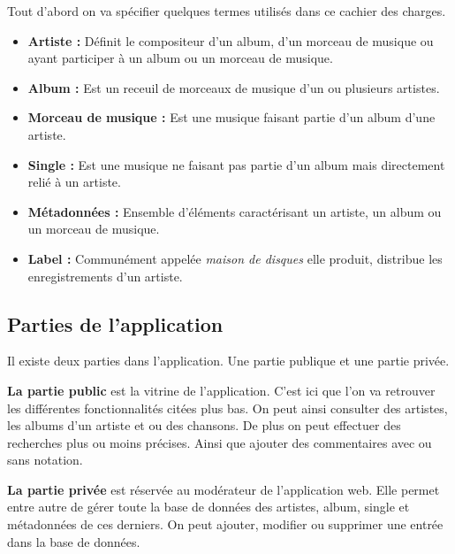     \begin{paragraphe}
      Tout d'abord on va spécifier quelques termes utilisés dans ce cachier des
      charges.
      \begin{itemize}
        \item \textbf{Artiste :} Définit le compositeur d'un album, d'un
          morceau de musique ou ayant participer à un album ou un morceau de
          musique.
        \item \textbf{Album :} Est un receuil de morceaux de musique d'un ou
          plusieurs artistes.
        \item \textbf{Morceau de musique :} Est une musique faisant partie d'un
          album d'une artiste.
        \item \textbf{Single :} Est une musique ne faisant pas partie d'un album
          mais directement relié à un artiste.
        \item \textbf{Métadonnées :} Ensemble d'éléments caractérisant un
          artiste, un album ou un morceau de musique.
        \item \textbf{Label :} Communément appelée \emph{maison de disques}
          elle produit, distribue les enregistrements d'un artiste.
      \end{itemize}
    \end{paragraphe}

  \subsection{Parties de l'application}

    \begin{paragraphe}
      Il existe deux parties dans l'application. Une partie publique et une partie
      privée.
    \end{paragraphe}

    \begin{paragraphe}
      \textbf{La partie public} est la vitrine de l'application. C'est ici que l'on
      va retrouver les différentes fonctionnalités citées plus bas. On peut
      ainsi consulter des artistes, les albums d'un artiste et ou des chansons.
      De plus on peut effectuer des recherches plus ou moins précises.
      Ainsi que ajouter des commentaires avec ou sans notation.

      \textbf{La partie privée} est réservée au modérateur de l'application web.
      Elle permet entre autre de gérer toute la base de données des artistes,
      album, single et métadonnées de ces derniers. On peut ajouter, modifier
      ou supprimer une entrée dans la base de données.
    \end{paragraphe}

